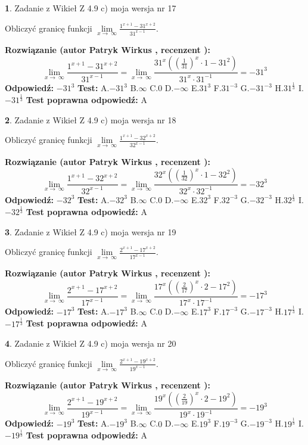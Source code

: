 \documentclass[12pt, a4paper]{article}
\theoremstyle{definition} %
\newtheorem{zad}{}
\newcommand{\zadStart}[1]{\begin{zad}#1\newline}
\newcommand{\zadStop}{\end{zad}}
\newcommand{\rozwStart}[2]{\noindent \textbf{Rozwiązanie (autor #1 , recenzent #2): }\newline}
\newcommand{\rozwStop}{\newline}
\newcommand{\odpStart}{\noindent \textbf{Odpowiedź:}\newline}
\newcommand{\odpStop}{\newline}
\newcommand{\testStart}{\noindent \textbf{Test:}\newline}
\newcommand{\testStop}{\newline}
\newcommand{\kluczStart}{\noindent \textbf{Test poprawna odpowiedź:}\newline}
\newcommand{\kluczStop}{\newline}
\begin{document}
\zadStart{Zadanie z Wikieł Z 4.9 c) moja wersja nr 17}


Obliczyć granicę funkcji  $\lim\limits_{x\to\ \infty}\frac{1^{x+1}-31^{x+2}}{31^{x-1}}$.
\zadStop
\rozwStart{Patryk Wirkus}{}
$$\lim\limits_{x\to\ \infty}\frac{1^{x+1}-31^{x+2}}{31^{x-1}}=\lim\limits_{x\to\ \infty}\frac{31^{x}((\frac{1}{31})^{x}\cdot 1 -31^{2})}{31^{x}\cdot 31^{-1}} = -31^{3}$$
\rozwStop
\odpStart
$-31^{3}$
\odpStop
\testStart
A.$-31^{3}$ B.$\infty$ C.$0$ D.$-\infty$ E.$31^{3}$
F.$31^{-3}$ G.$-31^{-3}$
H.$31^{\frac{1}{3}}$
I.$-31^{\frac{1}{3}}$
\testStop
\kluczStart
A
\kluczStop



\zadStart{Zadanie z Wikieł Z 4.9 c) moja wersja nr 18}


Obliczyć granicę funkcji  $\lim\limits_{x\to\ \infty}\frac{1^{x+1}-32^{x+2}}{32^{x-1}}$.
\zadStop
\rozwStart{Patryk Wirkus}{}
$$\lim\limits_{x\to\ \infty}\frac{1^{x+1}-32^{x+2}}{32^{x-1}}=\lim\limits_{x\to\ \infty}\frac{32^{x}((\frac{1}{32})^{x}\cdot 1 -32^{2})}{32^{x}\cdot 32^{-1}} = -32^{3}$$
\rozwStop
\odpStart
$-32^{3}$
\odpStop
\testStart
A.$-32^{3}$ B.$\infty$ C.$0$ D.$-\infty$ E.$32^{3}$
F.$32^{-3}$ G.$-32^{-3}$
H.$32^{\frac{1}{3}}$
I.$-32^{\frac{1}{3}}$
\testStop
\kluczStart
A
\kluczStop



\zadStart{Zadanie z Wikieł Z 4.9 c) moja wersja nr 19}


Obliczyć granicę funkcji  $\lim\limits_{x\to\ \infty}\frac{2^{x+1}-17^{x+2}}{17^{x-1}}$.
\zadStop
\rozwStart{Patryk Wirkus}{}
$$\lim\limits_{x\to\ \infty}\frac{2^{x+1}-17^{x+2}}{17^{x-1}}=\lim\limits_{x\to\ \infty}\frac{17^{x}((\frac{2}{17})^{x}\cdot 2 -17^{2})}{17^{x}\cdot 17^{-1}} = -17^{3}$$
\rozwStop
\odpStart
$-17^{3}$
\odpStop
\testStart
A.$-17^{3}$ B.$\infty$ C.$0$ D.$-\infty$ E.$17^{3}$
F.$17^{-3}$ G.$-17^{-3}$
H.$17^{\frac{1}{3}}$
I.$-17^{\frac{1}{3}}$
\testStop
\kluczStart
A
\kluczStop



\zadStart{Zadanie z Wikieł Z 4.9 c) moja wersja nr 20}


Obliczyć granicę funkcji  $\lim\limits_{x\to\ \infty}\frac{2^{x+1}-19^{x+2}}{19^{x-1}}$.
\zadStop
\rozwStart{Patryk Wirkus}{}
$$\lim\limits_{x\to\ \infty}\frac{2^{x+1}-19^{x+2}}{19^{x-1}}=\lim\limits_{x\to\ \infty}\frac{19^{x}((\frac{2}{19})^{x}\cdot 2 -19^{2})}{19^{x}\cdot 19^{-1}} = -19^{3}$$
\rozwStop
\odpStart
$-19^{3}$
\odpStop
\testStart
A.$-19^{3}$ B.$\infty$ C.$0$ D.$-\infty$ E.$19^{3}$
F.$19^{-3}$ G.$-19^{-3}$
H.$19^{\frac{1}{3}}$
I.$-19^{\frac{1}{3}}$
\testStop
\kluczStart
A
\kluczStop
\end{document}
